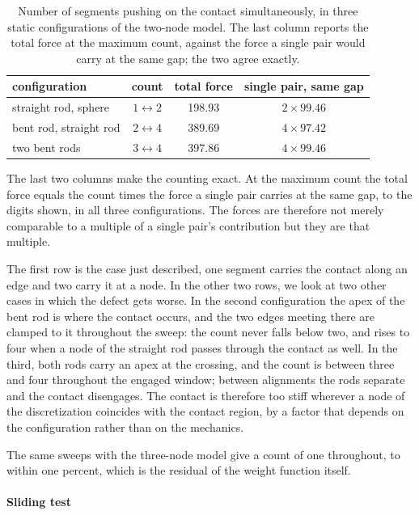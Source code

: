 \begin{table}[h]
\centering
\small
\caption{Number of segments pushing on the contact simultaneously, in three static configurations of the two-node model. The last column reports the total force at the maximum count, against the force a single pair would carry at the same gap; the two agree exactly.}
\label{tab:multiplicity}
\begin{tabular}{lccc}
\toprule
configuration & count & total force & single pair, same gap \\
\midrule
straight rod, sphere & $1 \leftrightarrow 2$ & 198.93 & $2 \times 99.46$ \\
bent rod, straight rod & $2 \leftrightarrow 4$ & 389.69 & $4 \times 97.42$ \\
two bent rods & $3 \leftrightarrow 4$ & 397.86 & $4 \times 99.46$ \\
\bottomrule
\end{tabular}
\end{table}

The last two columns make the counting exact. At the maximum count the total force equals the count times the force a single pair carries at the same gap, to the digits shown, in all three configurations. The forces are therefore not merely comparable to a multiple of a single pair's contribution but they are that multiple.

The first row is the case just described, one segment carries the contact along an edge and two carry it at a node. In the other two rows, we look at two other cases in which the defect gets worse. In the second configuration the apex of the bent rod is where the contact occurs, and the two edges meeting there are clamped to it throughout the sweep: the count never falls below two, and rises to four when a node of the straight rod passes through the contact as well. In the third, both rods carry an apex at the crossing, and the count is between three and four throughout the engaged window; between alignments the rods separate and the contact disengages. The contact is therefore too stiff wherever a node of the discretization coincides with the contact region, by a factor that depends on the configuration rather than on the mechanics.

The same sweeps with the three-node model give a count of one throughout, to within one percent, which is the residual of the weight function itself.

\paragraph{Sliding test}

